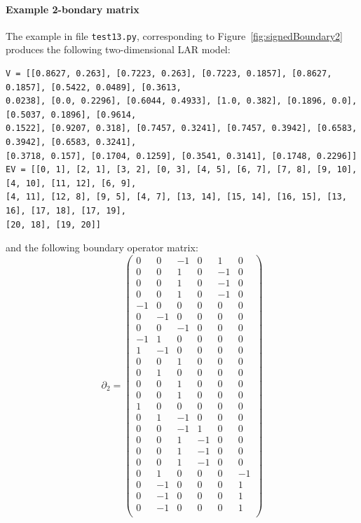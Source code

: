 \documentclass[11pt,oneside]{article}    %
\def\mat#1{{\left(\begin{array}{cccccccccccccccccccc}#1\end{array}\right)}}
\begin{document}
\paragraph{Example 2-bondary matrix}
The example in file \texttt{test13.py}, corresponding to Figure~\ref{fig:signedBoundary2} produces the following two-dimensional LAR model:
{\scriptsize
\begin{verbatim}
V = [[0.8627, 0.263], [0.7223, 0.263], [0.7223, 0.1857], [0.8627, 0.1857], [0.5422, 0.0489], [0.3613, 
0.0238], [0.0, 0.2296], [0.6044, 0.4933], [1.0, 0.382], [0.1896, 0.0], [0.5037, 0.1896], [0.9614, 
0.1522], [0.9207, 0.318], [0.7457, 0.3241], [0.7457, 0.3942], [0.6583, 0.3942], [0.6583, 0.3241], 
[0.3718, 0.157], [0.1704, 0.1259], [0.3541, 0.3141], [0.1748, 0.2296]] 
EV = [[0, 1], [2, 1], [3, 2], [0, 3], [4, 5], [6, 7], [7, 8], [9, 10], [4, 10], [11, 12], [6, 9], 
[4, 11], [12, 8], [9, 5], [4, 7], [13, 14], [15, 14], [16, 15], [13, 16], [17, 18], [17, 19], 
[20, 18], [19, 20]]
\end{verbatim}}
and the following boundary operator matrix:
\[
\partial_2 =
\mat{ 
 0 & 0 &-1 & 0 & 1 & 0 \\
 0 & 0 & 1 & 0 &-1 & 0 \\
 0 & 0 & 1 & 0 &-1 & 0 \\
 0 & 0 & 1 & 0 &-1 & 0 \\
-1 & 0 & 0 & 0 & 0 & 0 \\
 0 &-1 & 0 & 0 & 0 & 0 \\
 0 & 0 &-1 & 0 & 0 & 0 \\
-1 & 1 & 0 & 0 & 0 & 0 \\
 1 &-1 & 0 & 0 & 0 & 0 \\
 0 & 0 & 1 & 0 & 0 & 0 \\
 0 & 1 & 0 & 0 & 0 & 0 \\
 0 & 0 & 1 & 0 & 0 & 0 \\
 0 & 0 & 1 & 0 & 0 & 0 \\
 1 & 0 & 0 & 0 & 0 & 0 \\
 0 & 1 &-1 & 0 & 0 & 0 \\
 0 & 0 &-1 & 1 & 0 & 0 \\
 0 & 0 & 1 &-1 & 0 & 0 \\
 0 & 0 & 1 &-1 & 0 & 0 \\
 0 & 0 & 1 &-1 & 0 & 0 \\
 0 & 1 & 0 & 0 & 0 &-1 \\
 0 &-1 & 0 & 0 & 0 & 1 \\
 0 &-1 & 0 & 0 & 0 & 1 \\
 0 &-1 & 0 & 0 & 0 & 1 \\
 }
\]
\end{document}
